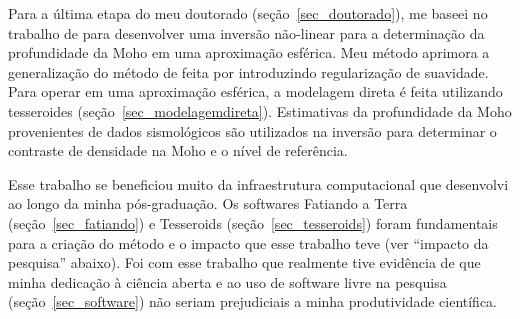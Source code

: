 \documentclass[12pt,a4paper,oneside]{book}
\begin{document}
Para a última etapa do meu doutorado (seção~\ref{sec_doutorado}), me baseei no
trabalho de \citet{Silva2014} para desenvolver uma inversão não-linear para
a determinação da profundidade da Moho em uma aproximação esférica.
Meu método aprimora a generalização do método de \citet{Bott1960} feita por
\citet{Silva2014} introduzindo regularização de suavidade.
Para operar em uma aproximação esférica, a modelagem direta é feita utilizando
tesseroides (seção~\ref{sec_modelagemdireta}).
Estimativas da profundidade da Moho provenientes de dados sismológicos são
utilizados na inversão para determinar o contraste de densidade na Moho e o
nível de referência.

Esse trabalho se beneficiou muito da infraestrutura computacional que
desenvolvi ao longo da minha pós-graduação.
Os softwares Fatiando a Terra (seção~\ref{sec_fatiando}) e Tesseroids
(seção~\ref{sec_tesseroids}) foram fundamentais para a criação do método e
o impacto que esse trabalho teve (ver ``impacto da pesquisa'' abaixo).
Foi com esse trabalho que realmente tive evidência de que minha dedicação à
ciência aberta e ao uso de software livre na pesquisa
(seção~\ref{sec_software}) não seriam prejudiciais a minha produtividade
científica.
\end{document}
